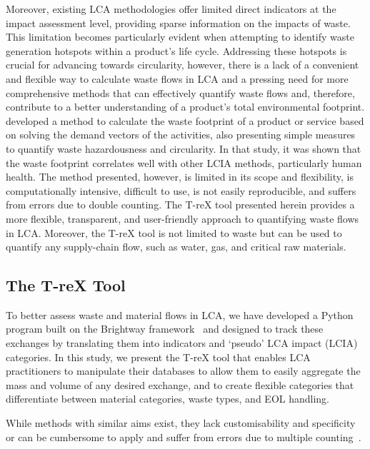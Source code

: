 Moreover, existing LCA methodologies offer limited direct indicators at the impact assessment level, providing sparse information on the impacts of waste. This limitation becomes particularly evident when attempting to identify waste generation hotspots within a product's life cycle. Addressing these hotspots is crucial for advancing towards circularity, however,  there is a lack of a convenient and flexible way to calculate waste flows in LCA and a pressing need for more comprehensive methods that can effectively quantify waste flows and, therefore, contribute to a better understanding of a product's total environmental footprint.
\cite{laurenti2023wastefootprint} developed a method to calculate the waste footprint of a product or service based on solving the demand vectors of the activities, also presenting simple measures to quantify waste hazardousness and circularity. In that study, it was shown that the waste footprint correlates well with other LCIA methods, particularly human health. The method presented, however, is limited in its scope and flexibility, is computationally intensive, difficult to use, is not easily reproducible, and suffers from errors due to double counting. The T-reX tool presented herein provides a more flexible, transparent, and user-friendly approach to quantifying waste flows in LCA. Moreover, the T-reX tool is not limited to waste but can be used to quantify any supply-chain flow, such as water, gas, and critical raw materials. 

\subsection{The T-reX Tool}

To better assess waste and material flows in LCA, we have developed a Python program built on the Brightway framework~\citep{mutel2017brightway} and designed to track these exchanges by translating them into indicators and `pseudo' LCA impact (LCIA) categories. In this study, we present the T-reX tool that enables LCA practitioners to manipulate their databases to allow them to easily aggregate the mass and volume of any desired exchange, and to create flexible categories that differentiate between material categories, waste types, and EOL handling.

While methods with similar aims exist, they lack customisability and specificity~\citep{foen2021ecofactors} or can be cumbersome to apply and suffer from errors due to multiple counting~\citep{laurenti2023wastefootprint}.

